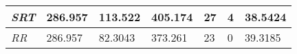 \documentclass{article}
\begin{document}
\begin{table}[h!]
\begin{tabular}{|l|l|l|l|l|l|l|}
  \textit{SRT}       & 286.957                                                                          & 113.522                                                                     & 405.174                                                                            & 27                                                                                    & 4                                                                                   & 38.5424                                                                    \\ \hline
  \textit{RR}        & 286.957                                                                          & 82.3043                                                                     & 373.261                                                                            & 23                                                                                    & 0                                                                                   & 39.3185                                                                    \\ \hline
  \end{tabular}
  \label{table:3}
\end{table}
\end{document}

